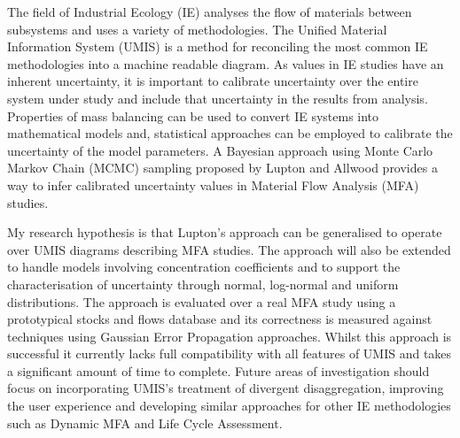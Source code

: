 \documentclass[ %
                    author={Tom Jager},
                supervisor={Dr. Daniel Schien},
                    degree={MEng},
                     title={A Bayesian Inference Engine for Calibrating Uncertainty over UMIS Structured MFA Systems},
                  subtitle={},
                      type={research},
                      year={2019} ]{dissertation}
\begin{document}
\noindent
The field of Industrial Ecology (IE) analyses the flow of materials between subsystems and uses a variety of methodologies. The Unified Material Information System (UMIS) is a method for reconciling the most common IE methodologies into a machine readable diagram. As values in IE studies have an inherent uncertainty, it is important to calibrate uncertainty over the entire system under study and include that uncertainty in the results from analysis. Properties of mass balancing can be used to convert IE systems into mathematical models and, statistical approaches can be employed to calibrate the uncertainty of the model parameters. A Bayesian approach using Monte Carlo Markov Chain (MCMC) sampling proposed by Lupton and Allwood provides a way to infer calibrated uncertainty values in Material Flow Analysis (MFA) studies. 

My research hypothesis is that Lupton's approach can be generalised to operate over UMIS diagrams describing MFA studies. The approach will also be extended to handle models involving concentration coefficients and to support the characterisation of uncertainty through normal, log-normal and uniform distributions. The approach is evaluated over a real MFA study using a prototypical stocks and flows database and its correctness is measured against techniques using Gaussian Error Propagation approaches. Whilst this approach is successful it currently lacks full compatibility with all features of UMIS and takes a significant amount of time to complete. Future areas of investigation should focus on incorporating UMIS's treatment of divergent disaggregation, improving the user experience and developing similar approaches for other IE methodologies such as Dynamic MFA and Life Cycle Assessment.
\end{document}
